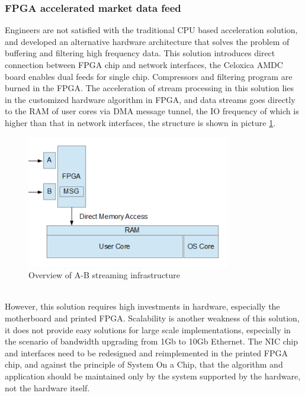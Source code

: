 \documentclass[11pt,openright,a4paper]{report}
\begin{document}
\subsubsection{FPGA accelerated market data feed}
Engineers are not satisfied with the traditional CPU based acceleration solution, and developed an alternative hardware architecture that solves the problem of buffering and filtering high frequency data. This solution introduces direct connection between FPGA chip and network interfaces, the Celoxica AMDC board enables dual feeds for single chip. Compressors and filtering program are burned in the FPGA\cite{morris2009fpga}. The acceleration of stream processing in this solution lies in the customized hardware algorithm in FPGA, and data streams goes directly to the RAM of user cores via DMA message tunnel, the IO frequency of which is higher than that in network interfaces, the structure is shown in picture \ref{fig:4}.\\
\begin{figure}[htbp]
	\centering\includegraphics[width=3.5in]{picture/FPGAcall.png}
	\caption{Overview of A-B streaming infrastructure}
	\label{fig:4}
\end{figure}\\
However, this solution requires high investments in hardware, especially the motherboard and printed FPGA. Scalability is another weakness of this solution, it does not provide easy solutions for large scale implementations, especially in the scenario of bandwidth upgrading from 1Gb to 10Gb Ethernet. The NIC chip and interfaces need to be redesigned and reimplemented in the printed FPGA chip, and against the principle of System On a Chip, that the algorithm and application should be maintained only by the system supported by the hardware, not the hardware itself\cite{klaas2004system}.\\
\end{document}
